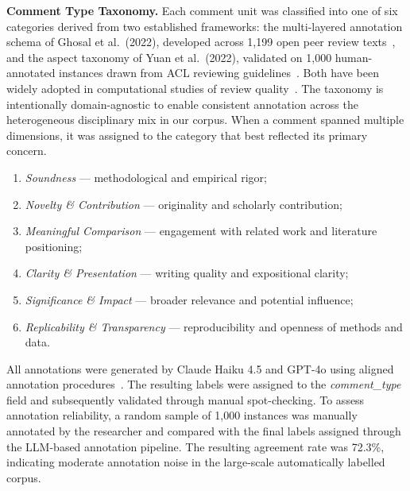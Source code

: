 \documentclass[preprint,10pt,times]{elsarticle}
\begin{document}
\textbf{Comment Type Taxonomy.} Each comment unit was classified into one of six categories derived from two established frameworks: the multi-layered annotation schema of Ghosal et al.\ (2022), developed across 1,199 open peer review texts~\cite{ref24}, and the aspect taxonomy of Yuan et al.\ (2022), validated on 1,000 human-annotated instances drawn from ACL reviewing guidelines~\cite{ref25}. Both have been widely adopted in computational studies of review quality~\cite{ref37,ref38}. The taxonomy is intentionally domain-agnostic to enable consistent annotation across the heterogeneous disciplinary mix in our corpus. When a comment spanned multiple dimensions, it was assigned to the category that best reflected its primary concern.
\begin{enumerate}[label=(\arabic*)]
  \item \textit{Soundness} --- methodological and empirical rigor;
  \item \textit{Novelty \& Contribution} --- originality and scholarly contribution;
  \item \textit{Meaningful Comparison} --- engagement with related work and literature positioning;
  \item \textit{Clarity \& Presentation} --- writing quality and expositional clarity;
  \item \textit{Significance \& Impact} --- broader relevance and potential influence;
  \item \textit{Replicability \& Transparency} --- reproducibility and openness of methods and data.
\end{enumerate}
All annotations were generated by Claude Haiku 4.5 and GPT-4o using aligned annotation procedures~\cite{ref39}. The resulting labels were assigned to the \textit{comment\_type} field and subsequently validated through manual spot-checking. To assess annotation reliability, a random sample of 1,000 instances was manually annotated by the researcher and compared with the final labels assigned through the LLM-based annotation pipeline. The resulting agreement rate was 72.3\%, indicating moderate annotation noise in the large-scale automatically labelled corpus.
\end{document}
